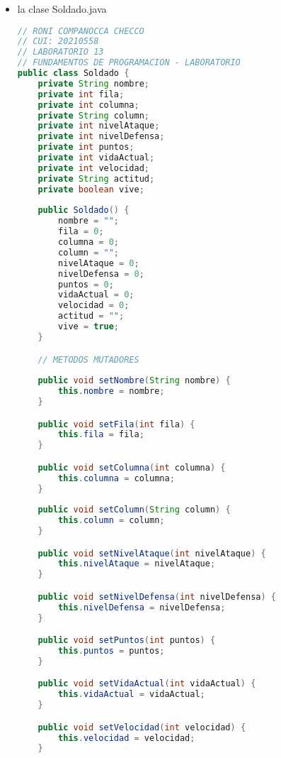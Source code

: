\documentclass{article}
\begin{document}
\begin{itemize}
\begin{lstlisting}[language=java]
    // METODO QUE NOS AYUDA A ORDENAR LOS SOLDADOS DE ACUERDO A SU NIVEL DE VIDA, EN ESTA OCACION DIFERENTE A LA ANTERIOR QUE ERA ALGORITMO DE BURBUJA
    public static void ordenarPorVidaMetodoB(ArrayList<Soldado> soldadito) {
        Collections.sort(soldadito, new Comparator<Soldado>() {
            public int compare(Soldado s1, Soldado s2) {
                // Orden descendente por puntos de vida
                return Integer.compare(s2.getPuntos(), s1.getPuntos());
            }
        });
    }
}
        \end{lstlisting}

        \item la clase Soldado.java
        \begin{lstlisting}[language=java]
// RONI COMPANOCCA CHECCO
// CUI: 20210558
// LABORATORIO 13
// FUNDAMENTOS DE PROGRAMACION - LABORATORIO
public class Soldado {
	private String nombre;
    private int fila;
    private int columna;
    private String column;
    private int nivelAtaque;
    private int nivelDefensa;
    private int puntos;
    private int vidaActual;
    private int velocidad;
    private String actitud;
    private boolean vive;
	
	public Soldado() {
		nombre = "";
        fila = 0;
        columna = 0;
        column = "";
        nivelAtaque = 0;
        nivelDefensa = 0;
        puntos = 0;
        vidaActual = 0;
        velocidad = 0;
        actitud = "";
        vive = true;
	}

	// METODOS MUTADORES
	
	public void setNombre(String nombre) {
		this.nombre = nombre;
	}

	public void setFila(int fila) {
		this.fila = fila;
	}

	public void setColumna(int columna) {
		this.columna = columna;
	}
	
	public void setColumn(String column) {
		this.column = column;
	}

	public void setNivelAtaque(int nivelAtaque) {
        this.nivelAtaque = nivelAtaque;
    }

    public void setNivelDefensa(int nivelDefensa) {
        this.nivelDefensa = nivelDefensa;
    }

    public void setPuntos(int puntos) {
        this.puntos = puntos;
    }

    public void setVidaActual(int vidaActual) {
        this.vidaActual = vidaActual;
    }

    public void setVelocidad(int velocidad) {
        this.velocidad = velocidad;
    }


\end{lstlisting}
\end{itemize}
\end{document}
